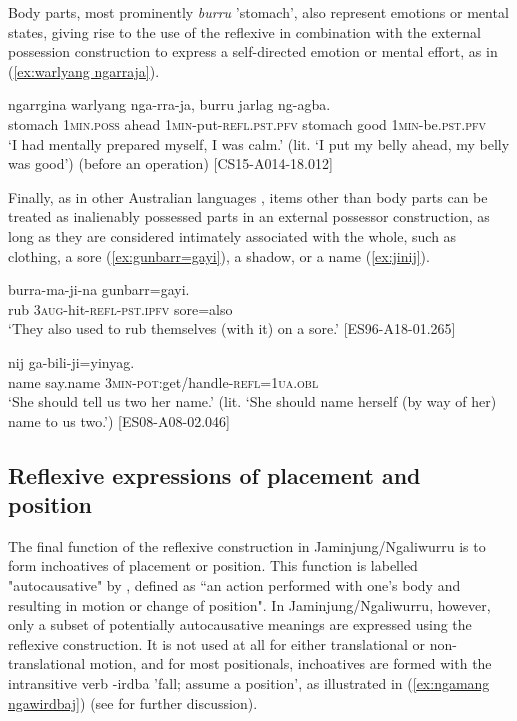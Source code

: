 \documentclass[output=paper,colorlinks,citecolor=brown]{langscibook}
\begin{document}
Body parts, most prominently \textit{burru} 'stomach', also represent emotions or mental states, giving rise to the use of the reflexive in combination with the external possession construction to express a self-directed emotion or mental effort, as in (\ref{ex:warlyang ngarraja}).

\ea
{} {ngarrgina} {warlyang} {nga-rra-ja}, {burru} {jarlag} {ng-agba.} \\
stomach \textsc{1min.poss} ahead \textsc{1min}-put-\textsc{refl.pst.pfv} stomach good \textsc{1min}-be.\textsc{pst.pfv} \\
\glt `I had mentally prepared myself, I was calm.' (lit. `I put my belly ahead, my belly was good') (before an operation) [CS15-A014-18.012]
\label{ex:warlyang ngarraja}
\z

Finally, as in other Australian languages \citep{Gabyinpress}, items other than body parts can be treated as inalienably possessed parts in an external possessor construction, as long as they are considered intimately associated with the whole, such as clothing, a sore (\ref{ex:gunbarr=gayi}), a shadow, or a name (\ref{ex:jinij}).

\ea
{} {burra-ma-ji-na} {gunbarr=gayi}. \\
rub \textsc{3aug}-hit-\textsc{refl-pst.ipfv} sore=also \\
\glt `They also used to rub themselves (with it) on a sore.' [ES96-A18-01.265]
\label{ex:gunbarr=gayi}
\z

\ea
{} {nij} {ga-bili-ji=yinyag}. \\
name say.name \textsc{3min-pot}:get/handle-\textsc{refl=1ua.obl} \\
\glt `She should tell us two her name.' (lit. `She should name herself (by way of her) name to us two.') [ES08-A08-02.046]
\label{ex:jinij}
\z

\subsection{Reflexive expressions of placement and position} \label{sec:SchultzeBernd:4.3}

The final function of the reflexive construction in Jaminjung/Ngaliwurru is to form inchoatives of placement or position. This function is labelled "autocausative" by \citet[196--197]{Geniusiene1987}, defined as “an action performed with one’s body and resulting in motion or change of position". In Jaminjung/Ngaliwurru, however, only a subset of potentially autocausative meanings are expressed using the reflexive construction. It is not used at all for either translational or non-translational motion, and for most positionals, inchoatives  are formed with the intransitive verb {-irdba} 'fall; assume a position', as illustrated in (\ref{ex:ngamang ngawirdbaj}) (see \citealt{SchultzeBerndt2015} for further discussion). 
\end{document}
